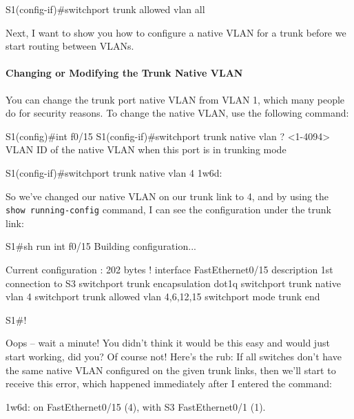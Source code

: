 \begin{cli}
S1(config-if)#switchport trunk allowed vlan all
\end{cli}

Next, I want to show you how to configure a native VLAN for a trunk
before we start routing between VLANs.

\paragraph{Changing or Modifying the Trunk Native VLAN}

You can change the trunk port native VLAN from VLAN 1, which many people
do for security reasons. To change the native VLAN, use the following
command:

\begin{cli}
S1(config)#int f0/15
S1(config-if)#switchport trunk native vlan ?
  <1-4094>  VLAN ID of the native VLAN when this port is in trunking mode
\end{cli}

\begin{cli}
S1(config-if)#switchport trunk native vlan 4
1w6d: %
\end{cli}

So we've changed our native VLAN on our trunk link to 4, and by using
the \texttt{show\ running-config} command, I can see the configuration
under the trunk link:

\begin{cli}
S1#sh run int f0/15
Building configuration...
 
Current configuration : 202 bytes
!
interface FastEthernet0/15
 description 1st connection to S3
 switchport trunk encapsulation dot1q
 switchport trunk native vlan 4
 switchport trunk allowed vlan 4,6,12,15
 switchport mode trunk
end
 
S1#!
\end{cli}

Oops -- wait a minute!
You didn't think it would be this easy and would just start working, did
you? Of course not! Here's the rub: If all switches don't have the same
native VLAN configured on the given trunk links, then we'll start to
receive this error, which happened immediately after I entered the
command:

\begin{cli}
1w6d: %
on FastEthernet0/15 (4), with S3 FastEthernet0/1 (1).
\end{cli}

